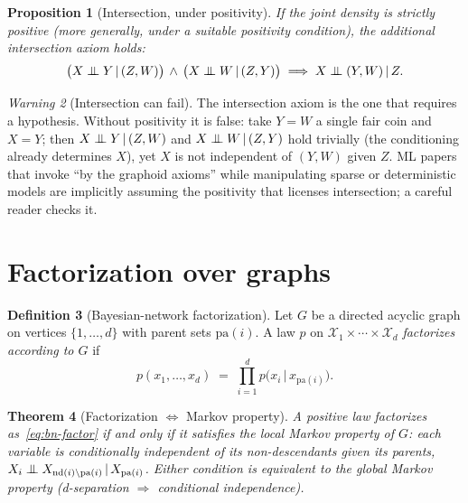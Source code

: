 \documentclass[11pt,oneside]{report}
\theoremstyle{plain}
\newtheorem{theorem}{Theorem}[chapter]
\newtheorem{proposition}[theorem]{Proposition}
\theoremstyle{definition}
\newtheorem{definition}[theorem]{Definition}
\theoremstyle{remark}
\newtheorem{warning}[theorem]{Warning}
\newcommand{\Xcal}{\mathcal{X}}
\newcommand{\given}{\,\vert\,}
\newcommand{\indep}{\mathrel{\perp\mkern-10mu\perp}}
\numberwithin{equation}{chapter}
\begin{document}
\begin{proposition}[Intersection, under positivity]\label{prop:intersection}
If the joint density is strictly positive (more generally, under a
suitable positivity condition), the additional \emph{intersection} axiom
holds:
\begin{equation}
  \bigl(X\indep Y\given (Z,W)\bigr)\,\wedge\,
  \bigl(X\indep W\given (Z,Y)\bigr)\;\Longrightarrow\;
  X\indep (Y,W)\given Z.
\end{equation}
\end{proposition}

\begin{warning}[Intersection can fail]
The intersection axiom is the one that requires a hypothesis. Without
positivity it is false: take $Y=W$ a single fair coin and $X=Y$; then
$X\indep Y\given (Z,W)$ and $X\indep W\given (Z,Y)$ hold trivially (the
conditioning already determines $X$), yet $X$ is not independent of
$(Y,W)$ given $Z$. ML papers that invoke ``by the graphoid axioms'' while
manipulating sparse or deterministic models are implicitly assuming the
positivity that licenses intersection; a careful reader checks it.
\end{warning}

\section{Factorization over graphs}

\begin{definition}[Bayesian-network factorization]\label{def:bn}
Let $G$ be a directed acyclic graph on vertices $\{1,\dots,d\}$ with parent
sets $\mathrm{pa}(i)$. A law $p$ on $\Xcal_1\times\cdots\times\Xcal_d$
\emph{factorizes according to $G$} if
\begin{equation}\label{eq:bn-factor}
  p(x_1,\dots,x_d)\;=\;\prod_{i=1}^d p\bigl(x_i\given x_{\mathrm{pa}(i)}\bigr).
\end{equation}
\end{definition}

\begin{theorem}[Factorization $\Leftrightarrow$ Markov property]
\label{thm:bn-markov}
A positive law factorizes as~\eqref{eq:bn-factor} if and only if it
satisfies the local Markov property of $G$: each variable is conditionally
independent of its non-descendants given its parents,
$X_i\indep X_{\mathrm{nd}(i)\setminus\mathrm{pa}(i)}\given X_{\mathrm{pa}(i)}$.
Either condition is equivalent to the global Markov property
(d-separation $\Rightarrow$ conditional independence).
\end{theorem}
\end{document}

